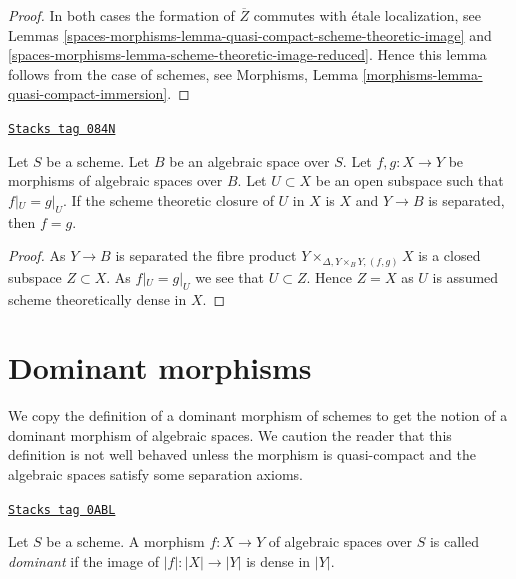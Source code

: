 \begin{proof}
In both cases the formation of $\overline{Z}$ commutes with
\'etale localization, see
Lemmas \ref{spaces-morphisms-lemma-quasi-compact-scheme-theoretic-image} and
\ref{spaces-morphisms-lemma-scheme-theoretic-image-reduced}.
Hence this lemma follows from the case of schemes, see
Morphisms, Lemma \ref{morphisms-lemma-quasi-compact-immersion}.
\end{proof}

\begin{lemma}
\label{spaces-morphisms-lemma-equality-of-morphisms}
\href{https://stacks.math.columbia.edu/tag/084N}{\texttt{Stacks tag 084N}}

Let $S$ be a scheme. Let $B$ be an algebraic space over $S$.
Let $f, g : X \to Y$ be morphisms of algebraic spaces over $B$.
Let $U \subset X$ be an open subspace such that
$f|_U = g|_U$. If the scheme theoretic closure of $U$
in $X$ is $X$ and $Y \to B$ is separated, then $f = g$.
\end{lemma}

\begin{proof}
As $Y \to B$ is separated the fibre product
$Y \times_{\Delta, Y \times_B Y, (f, g)} X$ is a closed subspace $Z \subset X$.
As $f|_U = g|_U$ we see that $U \subset Z$. Hence $Z = X$ as $U$ is assumed
scheme theoretically dense in $X$.
\end{proof}

\section{Dominant morphisms}
\label{spaces-morphisms-section-dominant}
We copy the definition of a dominant morphism of schemes to get the
notion of a dominant morphism of algebraic spaces. We caution the
reader that this definition is not well behaved unless the morphism
is quasi-compact and the algebraic spaces satisfy some separation
axioms.

\begin{definition}[Dominant]
\label{spaces-morphisms-definition-dominant}
\href{https://stacks.math.columbia.edu/tag/0ABL}{\texttt{Stacks tag 0ABL}}

Let $S$ be a scheme. A morphism $f : X \to Y$ of algebraic spaces over $S$ is
called {\it dominant} if the image of $|f| : |X| \to |Y|$ is dense in $|Y|$.
\end{definition}

